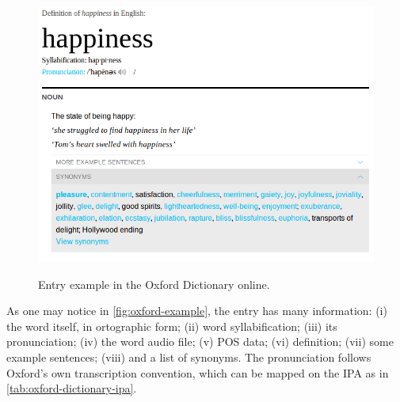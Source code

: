 \begin{figure}[!htb]
        \myfloatalign
        {\includegraphics[width=.66\linewidth]{gfx/example-oxford-definition.png}}
        \caption{Entry example in the Oxford Dictionary online.}
        \label{fig:oxford-example}
\end{figure}

As one may notice in \autoref{fig:oxford-example}, the entry has many information: (i) the word itself, in ortographic form;
(ii) word syllabification; (iii) its pronunciation; (iv) the word audio file;
(v) \ac{POS} data; (vi) definition; (vii) some example sentences; (viii) and a list of synonyms. The pronunciation
follows Oxford's own transcription convention, which can be mapped on the \ac{IPA} as in \autoref{tab:oxford-dictionary-ipa}.

